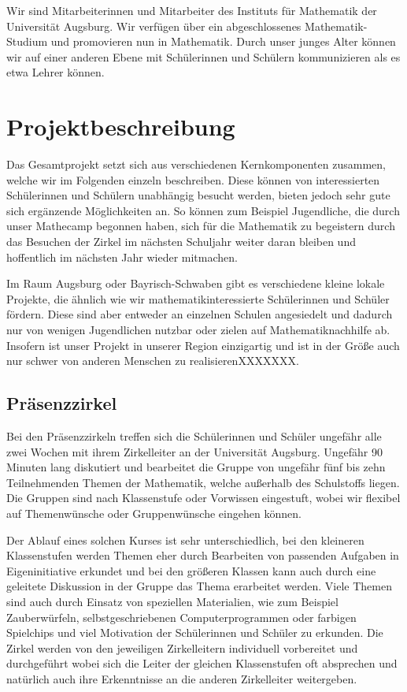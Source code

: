\documentclass[12pt]{zettel}
\begin{document}
Wir sind Mitarbeiterinnen und Mitarbeiter des Instituts für Mathematik der
Universität Augsburg. Wir verfügen über ein abgeschlossenes Mathematik-Studium
und promovieren nun in Mathematik. Durch unser junges Alter können wir auf
einer anderen Ebene mit Schülerinnen und Schülern kommunizieren als es etwa
Lehrer können.


\section{Projektbeschreibung}

Das Gesamtprojekt setzt sich aus verschiedenen Kernkomponenten zusammen,
welche wir im Folgenden einzeln beschreiben. Diese können von
interessierten Schülerinnen und Schülern unabhängig besucht werden,
bieten jedoch sehr gute sich ergänzende Möglichkeiten an. So können zum
Beispiel Jugendliche, die durch unser Mathecamp begonnen haben, sich für
die Mathematik zu begeistern durch das Besuchen der Zirkel im nächsten
Schuljahr weiter daran bleiben und hoffentlich im nächsten Jahr wieder
mitmachen.

Im Raum Augsburg oder Bayrisch-Schwaben gibt es verschiedene kleine
lokale Projekte, die ähnlich wie wir mathematikinteressierte
Schülerinnen und Schüler fördern. Diese sind aber entweder an einzelnen
Schulen angesiedelt und dadurch nur von wenigen Jugendlichen nutzbar
oder zielen auf Mathematiknachhilfe ab. Insofern ist unser Projekt in
unserer Region einzigartig und ist in der Größe auch nur schwer von
anderen Menschen zu realisierenXXXXXXX.

\subsection{Präsenzzirkel}

Bei den Präsenzzirkeln treffen sich die Schülerinnen und Schüler
ungefähr alle zwei Wochen mit ihrem Zirkelleiter an der Universität
Augsburg. Ungefähr 90 Minuten lang diskutiert und bearbeitet die Gruppe
von ungefähr fünf bis zehn Teilnehmenden Themen der Mathematik, welche
außerhalb des Schulstoffs liegen. Die Gruppen sind nach Klassenstufe
oder Vorwissen eingestuft, wobei wir flexibel auf Themenwünsche oder
Gruppenwünsche eingehen können.

Der Ablauf eines solchen Kurses ist sehr unterschiedlich, bei den
kleineren Klassenstufen werden Themen eher durch Bearbeiten von
passenden Aufgaben in Eigeninitiative erkundet und bei den größeren
Klassen kann auch durch eine geleitete Diskussion in der Gruppe das
Thema erarbeitet werden. Viele Themen sind auch durch Einsatz von
speziellen Materialien, wie zum Beispiel Zauberwürfeln,
selbstgeschriebenen Computerprogrammen oder farbigen Spielchips und viel
Motivation der Schülerinnen und Schüler zu erkunden. Die Zirkel werden
von den jeweiligen Zirkelleitern individuell vorbereitet und
durchgeführt wobei sich die Leiter der gleichen Klassenstufen oft
absprechen und natürlich auch ihre Erkenntnisse an die anderen
Zirkelleiter weitergeben.
\end{document}
